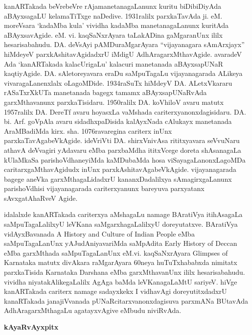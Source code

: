 \documentclass[11pt,a4size]{article}
\begin{document}
kanARTakada beVrebeVre rAjamanetanagaLanunx kuritu biDibiDiyAda
aBAyxsagaLU kelamaTiTxge naDedive. 1931ralilx parxkaTavAda
ji. eM. moreVsara `kadaMba kula' vividha kadaMba manetanagaLanunx
kuritAda aBAyxsavAgide. eM. vi. kaqSaNxrAyara taLakADina gaMgaranUnx
ililx hesarisabahudu. DA. deVsAyi pAMDuraMgarAyara ``vijayanagara
sAmArxjayx'' hiMdeyeV parxkAshitavAgidadxrU iMdigU
AdhAragarxMthavAgide. avaradeV Ada `kanARTakada kalacUrigaLu' kalacuri
manetanada aBAyxsapUNaR kaqtiyAgide. DA. sAletoreyavara eraDu
saMpuTagaLu vijayanagarada ALikeya vivaragaLanenxlalx
oLagoMDide. 1934raSuTx hiMdeyV DA. ALetxVkararu rASaTxrXkUTa
manetanada bagegx tamamx aBAyxsapUNaRvAda garxMthavanunx
parxkaTisidaru. 1950ralilx DA. koVhiloV avaru matutx 1957ralilx
DA. DereTf avaru hoyasxLa vaMshada
cariterxyanonxdagisidaru. DA. bi. Arf. goVpAla avaru sidadhxpaDisida
kalAyxNada cAlukayx manetanada AraMBadiMda kirx. sha. 1076ravaregina
cariterx inUnx parxkaTavAgabeVkAgide. ideVriVti DA. shirxVnivAsa
rititxyavara seVvuNaru athavA deVvagiri yAdavaru eMba parxbaMdha
ititxVcege doreta shAsanagaLa kUlaMkaSa parishoVdhaneyiMda kaMDubaMda
hosa viSayagaLanonxLagoMDa caritarxgaMthavAgidudx inUnx
parxkAshitavAgabeVkAgide. vijayanagarada bagege aneVka
garxMthagaLidadxrU kananxDadalilxya sAmagirxgaLanunx parishoVdhisi
vijayanagarada cariterxyanunx bareyuva parxyatanx sAvxgatAhaRveV
Agide.

idalalxde kanARTakada cariterxya aMshagaLu namage BAratiVya
itihAsagaLa saMpuTagaLalilxyU leVKana saMgarxhagaLalilxyU
doreyutatxve. BAratiVya vidAyxBavanada {\rm A History and Culture of
  Indian People} eMba saMpuTagaLanUnx yAJudAniyavariMda saMpAdita {\rm
  Early History of Deccan} eMba garxMthada saMpuTagaLanUnx
eM.vi. kaqSaNxrAyara {\rm Glimpses of Karnataka} matutx divAkara
raMgarAyara 60neya huTuTxhababxda nimitatx parxkaTisida {\rm Karnataka
  Darshana} eMba garxMthavanUnx ililx hesarisabahudu. vividha
niyatakAlikegaLalilx AgAga baMda leVKanagaLaMtU sariyeV. hiVge
kanARTakada cariterx namage sadayxkekx I vidhavAgi doreyutitxdadxrU
kanaRTakada janajiVvanada pUNaRcitarxvanonxdagisuva parxmANa BUtavAda
AdhAragarxMthagaLu agatayxvAgive eMbudu niviRvAda.

\medskip
\noindent
\textbf{\Large kAyaRvAyxpitx}
\smallskip
\end{document}
